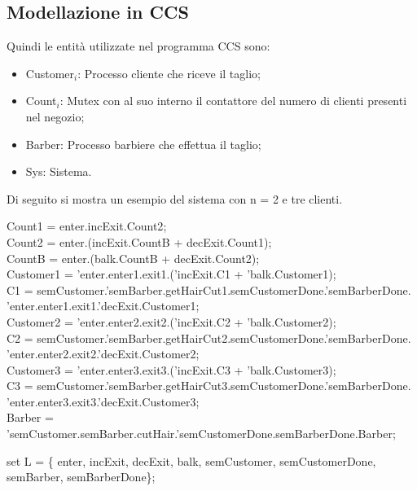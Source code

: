 \subsection{Modellazione in CCS}

Quindi le entità utilizzate nel programma CCS sono:
\begin{itemize}
	\item \textsf{Customer$_{i}$}: Processo cliente che riceve il taglio;
	\item \textsf{Count$_{i}$}: \textsf{Mutex} con al suo interno il contattore del numero di clienti presenti nel negozio;
	\item \textsf{Barber}: Processo barbiere che effettua il taglio;
	\item \textsf{Sys}: Sistema.
\end{itemize}

Di seguito si mostra un esempio del sistema con n = 2 e tre clienti.

\textsf{Count1 = enter.incExit.Count2};\\
\textsf{Count2 = enter.(incExit.CountB + decExit.Count1)};\\
\textsf{CountB = enter.(balk.CountB + decExit.Count2)};\\

\textsf{Customer1 = 'enter.enter1.exit1.('incExit.C1 + 'balk.Customer1)};\\
\textsf{C1 = semCustomer.'semBarber.getHairCut1.semCustomerDone.'semBarberDone.\\'enter.enter1.exit1.'decExit.Customer1};\\

\textsf{Customer2 = 'enter.enter2.exit2.('incExit.C2 + 'balk.Customer2)};\\
\textsf{C2 = semCustomer.'semBarber.getHairCut2.semCustomerDone.'semBarberDone.\\'enter.enter2.exit2.'decExit.Customer2};\\

\textsf{Customer3 = 'enter.enter3.exit3.('incExit.C3 + 'balk.Customer3)};\\
\textsf{C3 = semCustomer.'semBarber.getHairCut3.semCustomerDone.'semBarberDone.\\'enter.enter3.exit3.'decExit.Customer3};\\

\textsf{Barber = 'semCustomer.semBarber.cutHair.'semCustomerDone.semBarberDone.Barber};

\textsf{set L = \{ enter, incExit, decExit, balk, semCustomer, semCustomerDone, semBarber, semBarberDone\}};

